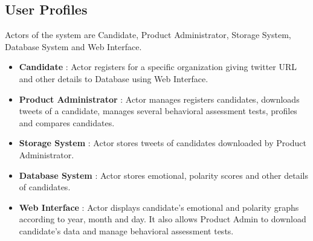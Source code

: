\documentclass[oneside,a4paper,12pt]{pictreport}
\begin{document}
\subsection{User Profiles}
Actors of the system are Candidate, Product Administrator, Storage System, Database System and Web Interface.
\begin{itemize}
    \item \textbf{Candidate} : Actor registers for a specific organization giving twitter URL and other details to Database using Web Interface.
    \item \textbf{Product Administrator} : Actor manages registers candidates, downloads tweets of a candidate, manages several behavioral assessment tests, profiles and compares candidates.
    \item \textbf{Storage System} : Actor stores tweets of candidates downloaded by Product Administrator.
    \item \textbf{Database System} : Actor stores emotional, polarity scores and other details of candidates.
    \item \textbf{Web Interface} : Actor displays candidate's emotional and polarity graphs according to year, month and day. It also allows Product Admin to download candidate's data and manage behavioral assessment tests.  
\end{itemize}
\newpage
\end{document}
